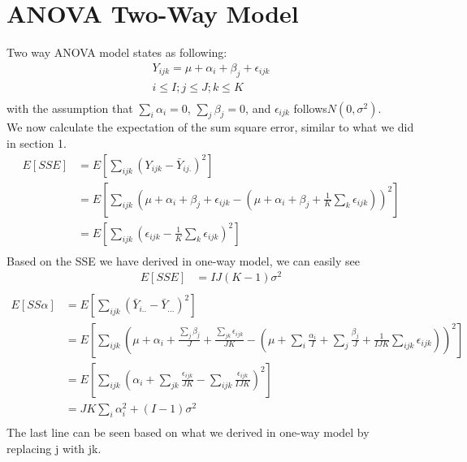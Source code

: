 \documentclass[a4paper]{article}
\begin{document}
\section{ANOVA Two-Way Model}
Two way ANOVA model states as following:\\
\begin{align*}
	Y_{ijk} = \mu + \alpha_i + \beta_j+ \epsilon_{ijk}\\
	i \leq I; j \leq J; k \leq K \\
\end{align*}
with the assumption that $\sum_i \alpha_i = 0$, $\sum_j \beta_j = 0$, and $\epsilon_{ijk}$ follows$N(0, \sigma^2)$.\\
We now calculate the expectation of the sum square error, similar to what we did in section 1.\\
\begin{align*}
	E[SSE] & = E[\sum_{ijk} (Y_{ijk} - \bar Y_{ij.})^2] \\
	       & = E[\sum_{ijk} (\mu + \alpha_i + \beta_j+  \epsilon_{ijk}
	       -(\mu + \alpha_i + \beta_j+ \frac{1}{K}\sum_k \epsilon_{ijk}))^2]\\
	       & = E[\sum_{ijk}(\epsilon_{ijk} -\frac{1}{K}\sum_{k} \epsilon_{ijk})^2] \\
\end{align*}
Based on the SSE we have derived in one-way model, we can easily see\\
\begin{align*}
	E[SSE] & = IJ(K-1) \sigma^2\\
\end{align*}
\begin{align*}
	E[SS\alpha] & = E[\sum_{ijk}(\bar Y_{i..} - \bar Y_{...})^2]\\
				& = E[\sum_{ijk}(\mu + \alpha_i + \frac{\sum_j \beta_j}{J} + \frac{\sum_{jk} \epsilon_{ijk}}{JK}
				-(\mu + \sum_{i} \frac{\alpha_i}{I} + \sum_j \frac{ \beta_j}{J}  + \frac{1}{IJK} \sum_{ijk} \epsilon_{ijk}))^2]\\
				& = E[\sum_{ijk}(\alpha_i + \sum_{jk} \frac{\epsilon_{ijk}}{JK} - \sum_{ijk} \frac{\epsilon_{ijk}}{IJK})^2]\\
				& = JK \sum_{i} \alpha^2_{i} + (I-1)\sigma^2 \\
\end{align*}
The last line can be seen based on what we derived in one-way model by replacing j with jk.\\
\end{document}
